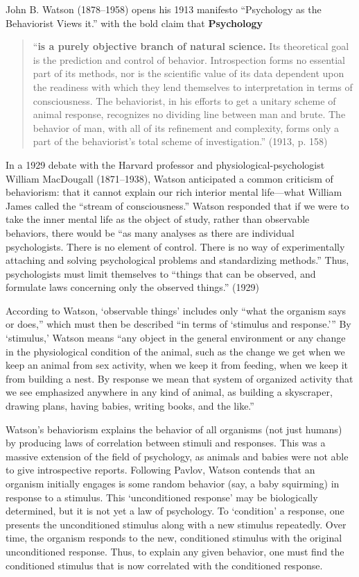 John B. Watson (1878--1958) opens his 1913 manifesto “Psychology as the Behaviorist Views it.” with the bold claim that \textbf{Psychology}

\begin{quote}

“\textbf{is a purely objective branch of natural science.} Its theoretical goal is the prediction and control of behavior. Introspection forms no essential part of its methods, nor is the scientific value of its data dependent upon the readiness with which they lend themselves to interpretation in terms of consciousness. The behaviorist, in his efforts to get a unitary scheme of animal response, recognizes no dividing line between man and brute. The behavior of man, with all of its refinement and complexity, forms only a part of the behaviorist's total scheme of investigation.” (1913, p. 158)
\end{quote}

In a 1929 debate with the Harvard professor and physiological-psychologist William MacDougall (1871--1938), Watson anticipated a common criticism of behaviorism: that it cannot explain our rich interior mental life---what William James called the “stream of consciousness.” Watson responded that if we were to take the inner mental life as the object of study, rather than observable behaviors, there would be “as many analyses as there are individual psychologists. There is no element of control. There is no way of experimentally attaching and solving psychological problems and standardizing methods.” Thus, psychologists must limit themselves to “things that can be observed, and formulate laws concerning only the observed things.” (1929)

According to Watson, ‘observable things’ includes only “what the organism says or does,” which must then be described “in terms of ‘stimulus and response.’” By ‘stimulus,’ Watson means “any object in the general environment or any change in the physiological condition of the animal, such as the change we get when we keep an animal from sex activity, when we keep it from feeding, when we keep it from building a nest. By response we mean that system of organized activity that we see emphasized anywhere in any kind of animal, as building a skyscraper, drawing plans, having babies, writing books, and the like.”

Watson’s behaviorism explains the behavior of all organisms (not just humans) by producing laws of correlation between stimuli and responses. This was a massive extension of the field of psychology, as animals and babies were not able to give introspective reports. Following Pavlov, Watson contends that an organism initially engages is some random behavior (say, a baby squirming) in response to a stimulus. This ‘unconditioned response’ may be biologically determined, but it is not yet a law of psychology. To ‘condition’ a response, one presents the unconditioned stimulus along with a new stimulus repeatedly. Over time, the organism responds to the new, conditioned stimulus with the original unconditioned response. Thus, to explain any given behavior, one must find the conditioned stimulus that is now correlated with the conditioned response.

